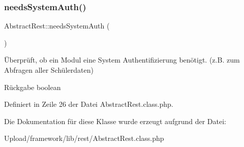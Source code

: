 \mbox{\label{class_abstract_rest_af1a1a4960dfd9cc1e3620fe66b98cb3f}} 
\subsubsection{\texorpdfstring{needs\+System\+Auth()}{needsSystemAuth()}}
{\footnotesize\ttfamily Abstract\+Rest\+::needs\+System\+Auth (\begin{DoxyParamCaption}{ }\end{DoxyParamCaption})}

Überprüft, ob ein Modul eine System Authentifizierung benötigt. (z.\+B. zum Abfragen aller Schülerdaten) \begin{DoxyReturn}{Rückgabe}
boolean 
\end{DoxyReturn}


Definiert in Zeile 26 der Datei Abstract\+Rest.\+class.\+php.



Die Dokumentation für diese Klasse wurde erzeugt aufgrund der Datei\+:\begin{DoxyCompactItemize}
\item 
Upload/framework/lib/rest/Abstract\+Rest.\+class.\+php\end{DoxyCompactItemize}
